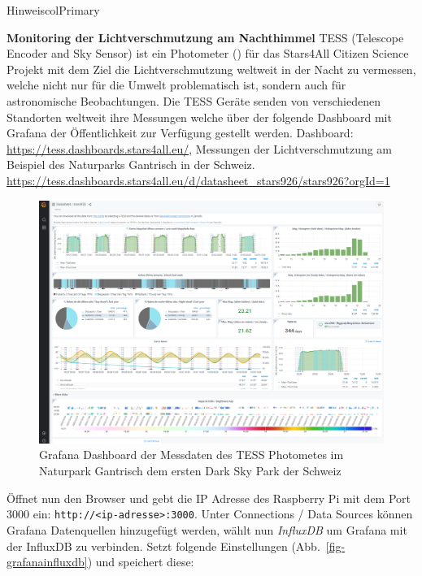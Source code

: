 \documentclass[
  11pt,
  a4paperpaper,
  oneside, openany  ,captions=tableheading
]{scrbook}
\theoremstyle{definition}
\theoremstyle{remark}
\begin{document}
\begin{boxtitle}{Hinweis}{colPrimary}

\textbf{Monitoring der Lichtverschmutzung am Nachthimmel} TESS
(Telescope Encoder and Sky Sensor) ist ein Photometer
() für das Stars4All
Citizen Science Projekt mit dem Ziel die Lichtverschmutzung weltweit in
der Nacht zu vermessen, welche nicht nur für die Umwelt problematisch
ist, sondern auch für astronomische Beobachtungen. Die TESS Geräte
senden von verschiedenen Standorten weltweit ihre Messungen welche über
der folgende Dashboard mit Grafana der Öffentlichkeit zur Verfügung
gestellt werden. Dashboard: \url{https://tess.dashboards.stars4all.eu/},
Messungen der Lichtverschmutzung am Beispiel des Naturparks Gantrisch in
der Schweiz.
\url{https://tess.dashboards.stars4all.eu/d/datasheet_stars926/stars926?orgId=1}

\begin{figure}[H]

{\centering \includegraphics{images/mqtt_grafana_tess4all.png}

}

\caption{Grafana Dashboard der Messdaten des TESS Photometes im
Naturpark Gantrisch dem ersten Dark Sky Park der Schweiz}

\end{figure}%

\end{boxtitle}

Öffnet nun den Browser und gebt die IP Adresse des Raspberry Pi mit dem
Port 3000 ein: \texttt{http://\textless{}ip-adresse\textgreater{}:3000}.
Unter Connections / Data Sources können Grafana Datenquellen hinzugefügt
werden, wählt nun \emph{InfluxDB} um Grafana mit der InfluxDB zu
verbinden. Setzt folgende Einstellungen (Abb.~\ref{fig-grafanainfluxdb})
und speichert diese:
\end{document}
